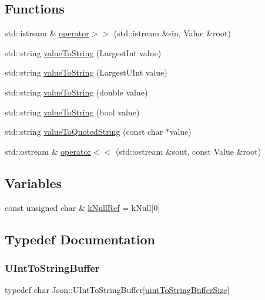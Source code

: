 \subsection*{Functions}
\begin{DoxyCompactItemize}
\item 
std\+::istream \& \mbox{\hyperlink{namespace_json_a2434499c0c7f057890b32787c05fc4a3}{operator$>$$>$}} (std\+::istream \&sin, Value \&root)
\item 
std\+::string \mbox{\hyperlink{namespace_json_abd9c650f70d9434f98f9025e2e2faf2d}{value\+To\+String}} (Largest\+Int value)
\item 
std\+::string \mbox{\hyperlink{namespace_json_a3f46b0bc62b95a9426a2da0117bdf9f0}{value\+To\+String}} (Largest\+U\+Int value)
\item 
std\+::string \mbox{\hyperlink{namespace_json_a99995d7dafa4f4970b349d7d3c8d1d99}{value\+To\+String}} (double value)
\item 
std\+::string \mbox{\hyperlink{namespace_json_a979ed531f091985e22f0051cd2a8e341}{value\+To\+String}} (bool value)
\item 
std\+::string \mbox{\hyperlink{namespace_json_aa0c8235a4a5c6599da5d3332743db8ac}{value\+To\+Quoted\+String}} (const char $\ast$value)
\item 
std\+::ostream \& \mbox{\hyperlink{namespace_json_a170ed6561399621db20f291e33b64fb7}{operator$<$$<$}} (std\+::ostream \&sout, const Value \&root)
\end{DoxyCompactItemize}
\subsection*{Variables}
\begin{DoxyCompactItemize}
\item 
const unsigned char \& \mbox{\hyperlink{namespace_json_ab30055b4bbd82aecaca57ccecd63bbe6}{k\+Null\+Ref}} = k\+Null\mbox{[}0\mbox{]}
\end{DoxyCompactItemize}


\subsection{Typedef Documentation}
\mbox{\label{namespace_json_a602bcf69c2042fb61c3b243cb16f04ca}} 
\subsubsection{\texorpdfstring{U\+Int\+To\+String\+Buffer}{UIntToStringBuffer}}
{\footnotesize\ttfamily typedef char Json\+::\+U\+Int\+To\+String\+Buffer\mbox{[}\mbox{\hyperlink{namespace_json_a0c5f614b019f20b4598dcaec09d9e820ae4f2008c7919f20d81286121d1374424}{uint\+To\+String\+Buffer\+Size}}\mbox{]}}



